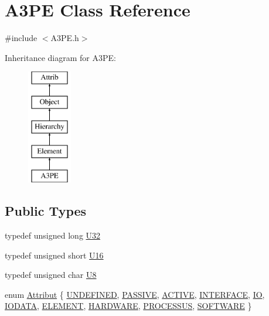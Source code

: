 \hypertarget{classA3PE}{}\section{A3\+PE Class Reference}
\label{classA3PE}


{\ttfamily \#include $<$A3\+P\+E.\+h$>$}

Inheritance diagram for A3\+PE\+:\begin{figure}[H]
\begin{center}
\leavevmode
\includegraphics[height=5.000000cm]{classA3PE}
\end{center}
\end{figure}
\subsection*{Public Types}
\begin{DoxyCompactItemize}
\item 
typedef unsigned long \hyperlink{classA3PE_af2773f4a4f8e9940b1e008386c4e908c}{U32}
\item 
typedef unsigned short \hyperlink{classA3PE_a2ee28b2899c3cc4f22821b4138758c28}{U16}
\item 
typedef unsigned char \hyperlink{classA3PE_ab70116c2810a9a01142a33c69fdda039}{U8}
\item 
enum \hyperlink{classAttrib_a69e171d7cc6417835a5a306d3c764235}{Attribut} \{ \newline
\hyperlink{classAttrib_a69e171d7cc6417835a5a306d3c764235a3a8da2ab97dda18aebab196fe4100531}{U\+N\+D\+E\+F\+I\+N\+ED}, 
\hyperlink{classAttrib_a69e171d7cc6417835a5a306d3c764235a2bfb2af57b87031d190a05fe25dd92ed}{P\+A\+S\+S\+I\+VE}, 
\hyperlink{classAttrib_a69e171d7cc6417835a5a306d3c764235a3b1fec929c0370d1436f2f06e298fb0d}{A\+C\+T\+I\+VE}, 
\hyperlink{classAttrib_a69e171d7cc6417835a5a306d3c764235aa27c16b480a369ea4d18b07b2516bbc7}{I\+N\+T\+E\+R\+F\+A\+CE}, 
\newline
\hyperlink{classAttrib_a69e171d7cc6417835a5a306d3c764235a1420a5b8c0540b2af210b6975eded7f9}{IO}, 
\hyperlink{classAttrib_a69e171d7cc6417835a5a306d3c764235a0af3b0d0ac323c1704e6c69cf90add28}{I\+O\+D\+A\+TA}, 
\hyperlink{classAttrib_a69e171d7cc6417835a5a306d3c764235a7788bc5dd333fd8ce18562b269c9dab1}{E\+L\+E\+M\+E\+NT}, 
\hyperlink{classAttrib_a69e171d7cc6417835a5a306d3c764235a61ceb22149f365f1780d18f9d1459423}{H\+A\+R\+D\+W\+A\+RE}, 
\newline
\hyperlink{classAttrib_a69e171d7cc6417835a5a306d3c764235a75250e29692496e73effca2c0330977f}{P\+R\+O\+C\+E\+S\+S\+US}, 
\hyperlink{classAttrib_a69e171d7cc6417835a5a306d3c764235a103a67cd0b8f07ef478fa45d4356e27b}{S\+O\+F\+T\+W\+A\+RE}
 \}
\end{DoxyCompactItemize}
